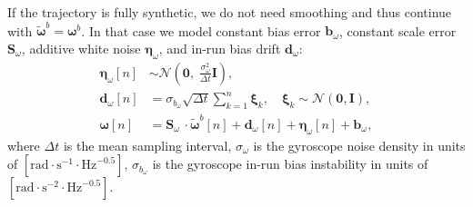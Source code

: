\documentclass[journal]{IEEEtran}
\renewcommand{\vec}[1]{\boldsymbol{#1}}
\begin{document}
If the trajectory is fully synthetic, we do not need smoothing and thus continue with $\tilde{\boldsymbol{\omega}}^b=\boldsymbol{\omega}^b$.
In that case we model constant bias error $\vec{b}_\omega$, constant scale error $\mathbf{S}_\omega$, additive white noise $\vec{\eta}_\omega$, and in-run bias drift $\vec{d}_\omega$:
\begin{align}
\boldsymbol{\eta}_\omega[n] &\sim \mathcal{N}\!\left(\mathbf{0},\;\frac{\sigma_{\omega}^2}{\Delta t}\mathbf{I}\right), \nonumber \\
\mathbf{d}_\omega[n] &= \sigma_{b_\omega}\sqrt{\Delta t}\sum_{k=1}^{n}\boldsymbol{\xi}_k,\quad
\boldsymbol{\xi}_k\sim\mathcal{N}(\mathbf{0},\mathbf{I}),\nonumber \\
\boldsymbol{\omega}[n] &= 
\mathbf{S}_\omega\, \cdot \tilde{\boldsymbol{\omega}}^b[n]+\vec{d}_\omega[n]+\vec{\eta}_\omega[n]+\vec{b}_\omega,\label{eq:simomega}
\end{align}
where $\Delta t$ is the mean sampling interval, $\sigma_{\omega}$ is the gyroscope noise density in units of $\left[\mathrm{rad}\cdot \mathrm{s}^{-1}\cdot \mathrm{Hz}^{-0.5}\right]$,
$\sigma_{b_\omega}$ is the gyroscope in-run bias instability in units of $\left[\mathrm{rad}\cdot \mathrm{s}^{-2}\cdot \mathrm{Hz}^{-0.5}\right]$.
\newline
\end{document}
